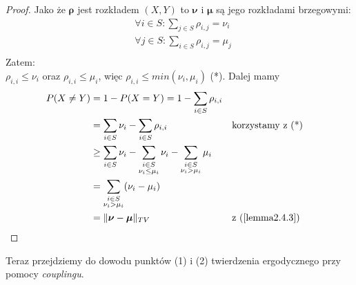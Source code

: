 \documentclass[a4paper]{article}
\theoremstyle{defn}
\theoremstyle{theorem}
\theoremstyle{lemma}
\theoremstyle{cor}
\theoremstyle{fact}
\begin{document}
\begin{proof}
Jako że $\boldsymbol{\rho}$ jest rozkładem $(X,Y)$ to $\boldsymbol{\nu}$ i $\boldsymbol{\mu}$ są jego rozkładami brzegowymi:
\begin{align*}
&\forall i \in S: \sum\limits_{j \in S} \rho_{i, j} = \nu_i\\
&\forall j \in S: \sum\limits_{i \in S} \rho_{i, j} = \mu_j\\
\end{align*}
Zatem:\\
$\rho_{i, i} \leq \nu_i$ oraz $\rho_{i, i} \leq \mu_i$, więc $\rho_{i,i} \leq min(\nu_i, \mu_i)$ (*). Dalej mamy
\begin{align*}
P(X \neq Y) &= 1 - P(X = Y) = 1 - \sum\limits_{i \in S} \rho_{i, i} \\
&= \sum\limits_{i \in S} \nu_i - \sum\limits_{i \in S} \rho_{i, i}  && \text{korzystamy z (*)}\\
&\geq \sum\limits_{i \in S} \nu_i - \sum\limits_{\substack{i \in S\\ \nu_i \leq \mu_i}} \nu_i - \sum\limits_{\substack{i \in S\\ \nu_i > \mu_i}} \mu_i \\
&= \sum\limits_{\substack{i \in S\\ \nu_i > \mu_i}} (\nu_i - \mu_i) \\
&= \|\boldsymbol{\nu} - \boldsymbol{\mu}\|_{TV} && \text{z (\ref{lemma2.4.3})}
\end{align*}
\end{proof}

Teraz przejdziemy do dowodu punktów (1) i (2) twierdzenia ergodycznego przy pomocy \textit{couplingu}.
\end{document}
